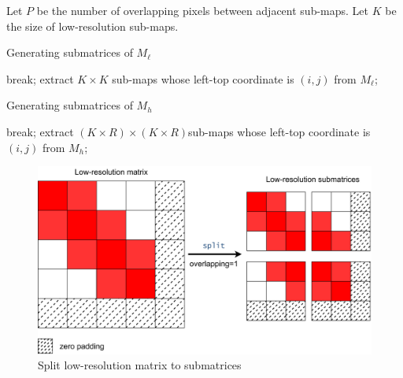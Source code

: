 \documentclass[a4paper,12pt]{article}
\begin{document}
Let $P$ be the number of overlapping pixels between adjacent sub-maps.
Let $K$ be the size of low-resolution sub-maps.

\begin{algorithm}[htbp]
\caption{Generating submatrices of $M_\ell$}
\begin{algorithmic}
                \STATE break;
            \ELSE 
                \STATE extract $K \times K$ sub-maps whose left-top coordinate is $(i,j)$ from $M_\ell$;
            \ENDIF    
        \ENDFOR
    \ENDFOR
\end{algorithmic}
\end{algorithm}

\begin{algorithm}[htbp]
\caption{Generating submatrices of $M_h$}
\begin{algorithmic}
                \STATE break; 
            \ELSE 
                \STATE extract $(K \times R) \times (K \times R)$sub-maps whose left-top coordinate is $(i,j)$ from $M_h$;
            \ENDIF
        \ENDFOR
    \ENDFOR    
\end{algorithmic}
\end{algorithm}

\begin{figure}[htbp]
\centering
\includegraphics[scale=0.03]{figures/lowres_split.png}
\caption{Split low-resolution matrix to submatrices}
\label{low-res to submatrices}
\end{figure}
\end{document}
